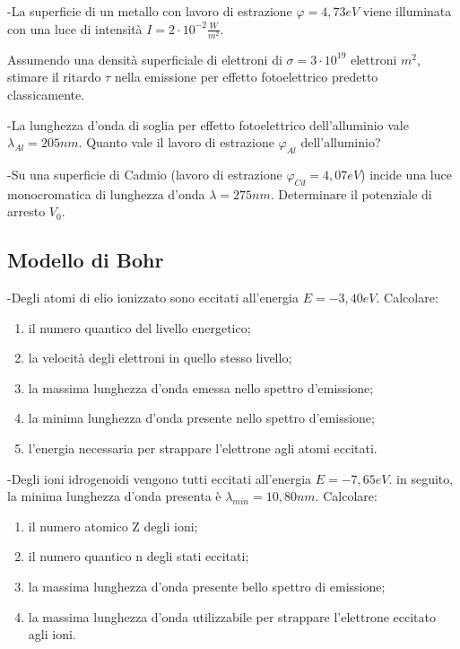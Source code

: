 \documentclass[12pt,twoside,a4]{article}
\begin{document}
\begin{esercizio}
	-La superficie di un metallo con lavoro di estrazione $\varphi=4,73 eV$ viene illuminata con una luce di intensità  $I=2 \cdot 10^{-2} \frac{W}{m^2}$. 
	
	Assumendo una densità  superficiale di elettroni di $\sigma =3 \cdot 10^{19} \text{ elettroni }m^2$, stimare il ritardo $\tau$ nella emissione per effetto fotoelettrico predetto classicamente.
\end{esercizio}

\begin{esercizio}
	-La lunghezza d'onda di soglia per effetto fotoelettrico dell'alluminio vale $\lambda_{Al}=205nm$. Quanto vale il lavoro di estrazione $\varphi_{Al}$ dell'alluminio?
\end{esercizio}

\begin{esercizio}
	-Su una superficie di Cadmio (lavoro di estrazione $\varphi_{Cd}=4,07eV$) incide una luce monocromatica di lunghezza d'onda $\lambda=275nm$. Determinare il potenziale di arresto $V_0$.
\end{esercizio}


\newpage
\subsection{Modello di Bohr}
\begin{esercizio}
-Degli atomi di elio ionizzato sono eccitati all'energia $E=-3,40 eV$. Calcolare:
\begin{enumerate}[label=(\textit{\roman*})]
	\item il numero quantico del livello energetico;
	\item la velocità  degli elettroni in quello stesso livello;
	\item la massima lunghezza d'onda emessa nello spettro d'emissione;
	\item la minima lunghezza d'onda presente nello spettro d'emissione;
	\item l'energia necessaria per strappare l'elettrone agli atomi eccitati.
\end{enumerate}
\end{esercizio}

\begin{esercizio}
-Degli ioni idrogenoidi vengono tutti eccitati all'energia $E=-7,65eV$. in seguito, la minima lunghezza d'onda presenta è $\lambda_{min}=10,80 nm$. Calcolare:
\begin{enumerate}[label=(\textit{\roman*})]
	\item il numero atomico Z degli ioni;
	\item il numero quantico n degli stati eccitati;
	\item la massima lunghezza d'onda presente bello spettro di emissione;
	\item la massima lunghezza d'onda utilizzabile per strappare l'elettrone eccitato agli ioni.
\end{enumerate}
\end{esercizio}
\end{document}
